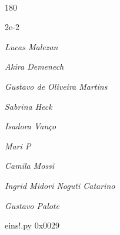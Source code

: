 \documentclass[12pt]{article}
\begin{document}

\pagebreak			

	\ 
	\vfill
	\begin{turn}{180}	
		\begin{minipage}{\textwidth}
		  	\ttfamily %
			\centering
			{\Huge 2e-2}
		  
			\hfill
		  
			

\textit{\small Lucas Malezan}

\textit{\small Akira Demenech}

\textit{\small Gustavo de Oliveira Martins}

\textit{\small Sabrina Heck}

\textit{\small Isadora Vanço}

\textit{\small Mari P}

\textit{\small Camila Mossi}

\textit{\small Ingrid Midori Noguti Catarino}

\textit{\small Gustavo Palote}

\bigskip

eins!.py
0x0029


		\end{minipage}	
	\end{turn}
	\vfill
	\

\pagebreak
\end{document}
